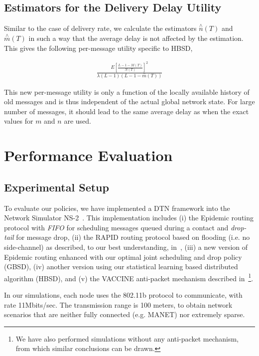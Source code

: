 \subsection{Estimators for the Delivery Delay Utility}
\label{sec:learning:EDD}
Similar to the case of delivery rate, we calculate the estimators $\stackrel{\wedge}{n}(T)$ and
$\stackrel{\wedge}{m}(T)$ in such a way that the average delay is not affected by the estimation. This gives the following per-message utility specific to HBSD,

\begin{align}
\label{HBSD-DD-U}
\frac{E[\frac{L-1-M(T)}{N(T)}]^2}{\lambda
(L-1)(L-1-\stackrel{-}{m}(T))}
\end{align}

This new per-message utility is only a function of the locally available history of old messages and is thus
independent of the actual global network state. For large number of messages, it should lead to the same average delay
as when the exact values for $m$ and $n$ are used.


\section{Performance Evaluation}
\label{sec:sims}

\subsection{Experimental Setup}
\label{sec:ExperimentalSetup}

To evaluate our policies, we have implemented a DTN framework into the Network Simulator NS-2~\cite{DTN-NS2}. This implementation includes (i) the Epidemic routing protocol with \emph{FIFO} for scheduling messages queued during a contact and \emph{drop-tail} for message drop, (ii) the RAPID routing protocol based on
flooding (i.e. no side-channel) as described, to our best
understanding, in~\cite{Levine:Sigcomm07}, (iii) a new version of Epidemic routing enhanced with our optimal joint scheduling and drop policy (GBSD), (iv) another version using our statistical learning based distributed algorithm (HBSD), and (v) the VACCINE anti-packet mechanism described
in~\cite{Towsley:Epidemic}\footnote{We have also performed simulations without any anti-packet mechanism, from which similar conclusions can be drawn.}.

In our simulations, each node uses the 802.11b protocol to communicate, with rate 11Mbits/sec. The transmission range is 100 meters, to obtain network scenarios that are neither fully connected (e.g. MANET) nor extremely sparse. 

